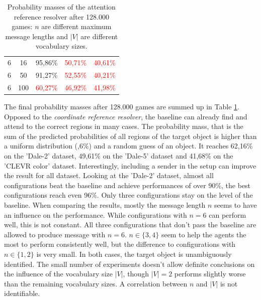 \begin{table}[ht]
\begin{tabular}{cc|c|c|c}
        {6}                           & {16}      & {95,86\%}                           & \textcolor{red}{50,71\%}            & \textcolor{red}{40,61\%}                 \\
        {6}                           & {50}      & {91,27\%}                           & \textcolor{red}{52,55\%}            & \textcolor{red}{40,21\%}                 \\
        {6}                           & {100}     & \textcolor{red}{60,27\%}            & \textcolor{red}{46,92\%}            & \textcolor{red}{41,98\%}                 \\
        \bottomrule
    \end{tabular}
    \caption{Probability masses of the attention reference resolver after 128.000 games: $n$ are different maximum message lengths and $|V|$ are different vocabulary sizes.}
    \label{tab:results:attention-reference-resolver-game}
\end{table}

The final probability masses after 128.000 games are summed up in Table \ref{tab:results:attention-reference-resolver-game}.
Opposed to the \emph{coordinate reference resolver}, the baseline can already find and attend to the correct regions in many cases.
The probability mass, that is the sum of the predicted probabilities of all regions of the target object is higher than a uniform distribution (,6\%) and a random guess of an object.
It reaches 62,16\% on the 'Dale-2' dataset, 49,61\% on the 'Dale-5' dataset and 41,68\% on the 'CLEVR color' dataset.
Interestingly, including a sender in the setup can improve the result for all dataset.
Looking at the 'Dale-2' dataset, almost all configurations beat the baseline and achieve performances of over 90\%, the best configurations reach even 96\%.
Only three configurations stay on the level of the baseline.
When comparing the results, mostly the message length $n$ seems to have an influence on the performance.
While configurations with $n=6$ can perform well, this is not constant.
All three configurations that don't pass the baseline are allowed to produce message with $n=6$.
$n \in \{3,4\}$ seem to help the agents the most to perform consistently well, but the difference to configurations with $n \in \{1,2\}$ is very small.
In both cases, the target object is unambiguously identified.
The small number of experiments doesn't allow definite conclusions on the influence of the vocabulary size $|V|$, though $|V|=2$ performs slightly worse than the remaining vocabulary sizes.
A correlation between $n$ and $|V|$ is not identifiable.

